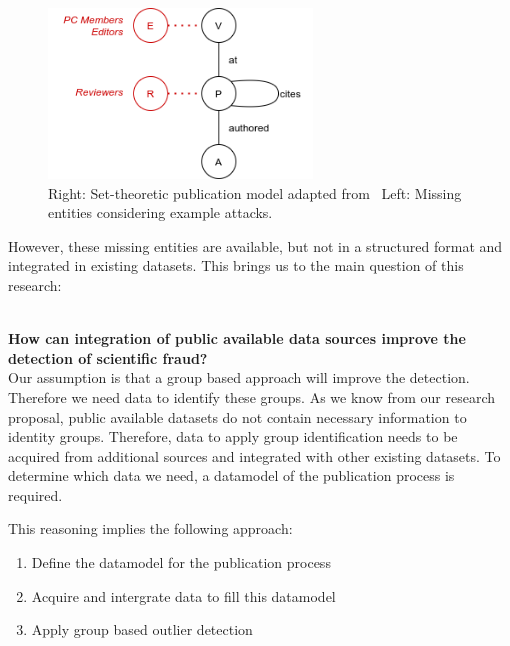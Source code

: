 \documentclass{ou-report}
\begin{document}
\begin{figure}[H]
\centering
\includegraphics[width=7cm]{images/jm2017_miss_ent.png}
\caption{Right: Set-theoretic publication model adapted from~\cite{JM2017} Left: Missing entities considering example attacks.}
\label{fig:jm2017_missing_ent}
\end{figure}

However, these missing entities are available, but not in a structured format and
integrated in existing datasets. This brings us to the main question of this research:


\ \\

\textbf{How can integration of public available data sources improve the detection of scientific fraud?} \\


Our assumption is that a group based approach will improve the detection. 
Therefore we need data to identify these groups. As we know from our research 
proposal, public available datasets do not contain necessary information to 
identity groups. Therefore, data to apply group identification needs to be 
acquired from additional sources and integrated with other existing datasets. 
To determine which data we need, a datamodel of the publication process is 
required.

This reasoning implies the following approach:
\begin{enumerate}
    \item Define the datamodel for the publication process
    \item Acquire and intergrate data to fill this datamodel
    \item Apply group based outlier detection
\end{enumerate}
\end{document}
